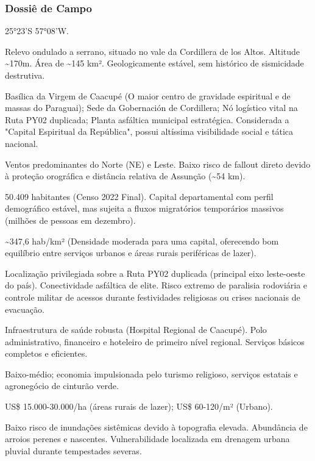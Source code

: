 \subsubsection{Dossiê de Campo}
\begin{description}[style=nextline,leftmargin=0.5cm,font=\bfseries]
\item[Coordenadas]  25°23'S 57°08'W.
\item[Topografia]  Relevo ondulado a serrano, situado no vale da Cordillera de los Altos. Altitude \textasciitilde 170m. Área de \textasciitilde 145 km². Geologicamente estável, sem histórico de sismicidade destrutiva.
\item[Alvos Estratégicos]  Basílica da Virgem de Caacupé (O maior centro de gravidade espiritual e de massas do Paraguai); Sede da Gobernación de Cordillera; Nó logístico vital na Ruta PY02 duplicada; Planta asfáltica municipal estratégica. Considerada a "Capital Espiritual da República", possui altíssima visibilidade social e tática nacional.
\item[Fallout]  Ventos predominantes do Norte (NE) e Leste. Baixo risco de fallout direto devido à proteção orográfica e distância relativa de Assunção (\textasciitilde 54 km).
\item[População]  50.409 habitantes (Censo 2022 Final). Capital departamental com perfil demográfico estável, mas sujeita a fluxos migratórios temporários massivos (milhões de pessoas em dezembro).
\item[Densidade]  \textasciitilde 347,6 hab/\allowbreak km² (Densidade moderada para uma capital, oferecendo bom equilíbrio entre serviços urbanos e áreas rurais periféricas de lazer).
\item[Vias de Acesso]  Localização privilegiada sobre a Ruta PY02 duplicada (principal eixo leste-oeste do país). Conectividade asfáltica de elite. Risco extremo de paralisia rodoviária e controle militar de acessos durante festividades religiosas ou crises nacionais de evacuação.
\item[Serviços]  Infraestrutura de saúde robusta (Hospital Regional de Caacupé). Polo administrativo, financeiro e hoteleiro de primeiro nível regional. Serviços básicos completos e eficientes.
\item[Custo de Vida]  Baixo-médio; economia impulsionada pelo turismo religioso, serviços estatais e agronegócio de cinturão verde.
\item[Preço da Terra]  US\$ 15.000-30.000/\allowbreak ha (áreas rurais de lazer); US\$ 60-120/\allowbreak m² (Urbano).
\item[Hidrologia]  Baixo risco de inundações sistêmicas devido à topografia elevada. Abundância de arroios perenes e nascentes. Vulnerabilidade localizada em drenagem urbana pluvial durante tempestades severas.

\end{description}
